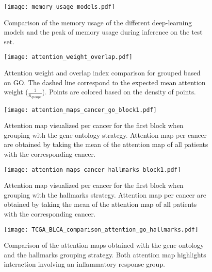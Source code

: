 \begin{figure}[htbp]
	\centering
	\texttt{[image: memory\_usage\_models.pdf]}
	\caption{Comparison of the memory usage of the different deep-learning models and the peak of memory usage during inference on the test set.}\label{fig:mem_uasge}
\end{figure}



\begin{figure}[htbp]
	\centering
	\texttt{[image: attention\_weight\_overlap.pdf]}
	\caption{Attention weight and overlap index comparison for grouped based on GO\@. The dashed line correspond to the expected mean attention weight (\(\frac{1}{n_{groups}} \)). Points are colored based on the density of points.}\label{fig:att_w_overlap}
\end{figure}

\begin{landscape}
	\begin{figure}[p]
		\centering
		\texttt{[image: attention\_maps\_cancer\_go\_block1.pdf]}
		\caption{Attention map visualized per cancer for the first block when grouping with the gene ontology strategy. Attention map per cancer are obtained by taking the mean of the attention map of all patients with the corresponding cancer. }\label{fig:att_map_cancer_go}
	\end{figure}

	\begin{figure}[p]
		\centering
		\texttt{[image: attention\_maps\_cancer\_hallmarks\_block1.pdf]}
		\caption{Attention map visualized per cancer for the first block when grouping with the hallmarks strategy. Attention map per cancer are obtained by taking the mean of the attention map of all patients with the corresponding cancer. }\label{fig:att_map_cancer_hallmarks}
	\end{figure}

	\begin{figure}[p]
		\centering
		\texttt{[image: TCGA\_BLCA\_comparison\_attention\_go\_hallmarks.pdf]}
		\caption{Comparison of the attention maps obtained with the gene ontology and the hallmarks grouping strategy. Both attention map highlights interaction involving an inflammatory response group. }\label{fig:att_map_blca_comp}
	\end{figure}
\end{landscape}